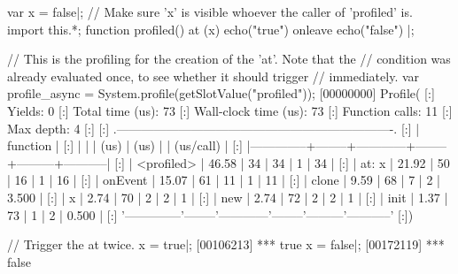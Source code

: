 \begin{urbiscript}
var x = false|;
// Make sure 'x' is visible whoever the caller of 'profiled' is.
import this.*;
function profiled()
{
  at (x)
    echo("true")
  onleave
    echo("false")
}|;

// This is the profiling for the creation of the 'at'. Note that the
// condition was already evaluated once, to see whether it should trigger
// immediately.
var profile_async = System.profile(getSlotValue("profiled"));
[00000000] Profile(
[:]  Yields:                    0
[:]  Total time (us):          73
[:]  Wall-clock time (us):     73
[:]  Function calls:           11
[:]  Max depth:                 4
[:]
[:]  .-------------------------------------------------------------------.
[:]  |   function   |   %
[:]  |              |        |    (us)    |  (us)  |         | (us/call) |
[:]  |--------------+--------+------------+--------+---------+-----------|
[:]  |   <profiled> |  46.58 |         34 |     34 |       1 |        34 |
[:]  |    at: { x } |  21.92 |         50 |     16 |       1 |        16 |
[:]  |      onEvent |  15.07 |         61 |     11 |       1 |        11 |
[:]  |        clone |   9.59 |         68 |      7 |       2 |     3.500 |
[:]  |            x |   2.74 |         70 |      2 |       2 |         1 |
[:]  |          new |   2.74 |         72 |      2 |       2 |         1 |
[:]  |         init |   1.37 |         73 |      1 |       2 |     0.500 |
[:]  '--------------'--------'------------'--------'---------'-----------'
[:])

// Trigger the at twice.
x = true|;
[00106213] *** true
x = false|;
[00172119] *** false


\end{urbiscript}
